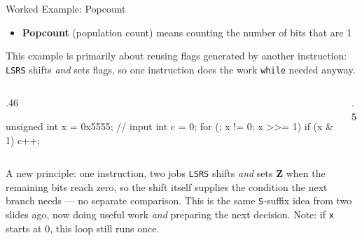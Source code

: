 \documentclass[9pt,aspectratio=169,xcolor=table]{beamer}
\begin{document}
\begin{frame}[fragile]{Worked Example: Popcount}
    \begin{itemize}
        \item \textbf{Popcount} (population count) means counting the number of bits that are 1
    \end{itemize}

    \vspace{0.5mm}
    {\small This example is primarily about \alert{reusing flags generated by
    another instruction}: \texttt{LSRS} shifts \emph{and} sets flags, so one
    instruction does the work \texttt{while} needed anyway.}

    \vspace{0.5mm}
    \begin{columns}[T]
    \begin{column}{.46\textwidth}
        \begin{cc}
unsigned int x = 0x5555;   // input
int c = 0;
for (; x != 0; x >>= 1)
    if (x & 1)
        c++;
\end{cc}
    \end{column}
    \begin{column}{.5\textwidth}
    \end{column}
    \end{columns}

    \vspace{0.5mm}
    \begin{block}{A new principle: one instruction, two jobs}
        \alert{\texttt{LSRS}} shifts \emph{and} sets \textbf{Z} when the
        remaining bits reach zero, so the shift itself supplies the
        condition the next branch needs --- no separate comparison.
        This is the same \texttt{S}-suffix idea from two slides ago,
        now doing useful work \emph{and} preparing the next decision.
        Note: if \texttt{x} starts at 0, this loop still runs once.
    \end{block}
\end{frame}
\end{document}
